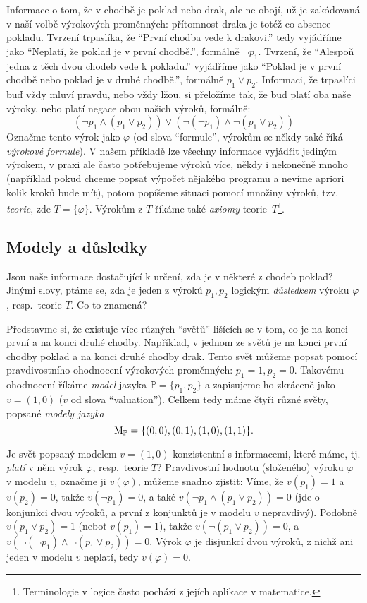 Informace o tom, že v chodbě je poklad nebo drak, ale ne obojí, už je zakódovaná v naší volbě výrokových proměnných: přítomnost draka je totéž co absence pokladu. Tvrzení trpaslíka, že ``První chodba vede k drakovi.'' tedy vyjádříme jako ``Neplatí, že poklad je v první chodbě.'', formálně \(\neg p_1\). Tvrzení, že ``Alespoň jedna z těch dvou chodeb vede k pokladu.'' vyjádříme jako ``Poklad je v první chodbě nebo poklad je v druhé chodbě.'', formálně \( p_1 \lor p_2\). Informaci, že trpaslíci buď vždy mluví pravdu, nebo vždy lžou, si přeložíme tak, že buď platí oba naše výroky, nebo platí negace obou našich výroků, formálně:
\[
    (\neg p_1 \land (p_1 \lor p_2)) \lor (\neg (\neg p_1) \land \neg (p_1 \lor p_2))
\]
Označme tento výrok jako \( \varphi \) (od slova ``formule'', výrokům se někdy také říká \emph{výrokové formule}). V našem příkladě lze všechny informace vyjádřit jediným výrokem, v praxi ale často potřebujeme výroků více, někdy i nekonečně mnoho (například pokud chceme popsat výpočet nějakého programu a nevíme apriori kolik kroků bude mít), potom popíšeme situaci pomocí množiny výroků, tzv. \emph{teorie}, zde \( T=\{ \varphi \} \). Výrokům z \( T \) říkáme také \emph{axiomy} teorie~\( T \)\footnote{Terminologie v logice často pochází z jejích aplikace v matematice.}.

\subsection{Modely a důsledky}

Jsou naše informace dostačující k určení, zda je v některé z chodeb poklad? Jinými slovy, ptáme se, zda je jeden z výroků \( p_1, p_2 \) logickým \emph{důsledkem} výroku \( \varphi \), resp.\ teorie \( T \). Co to znamená?

Představme si, že existuje více různých ``světů'' lišících se v tom, co je na konci první a na konci druhé chodby. Například, v jednom ze světů je na konci první chodby poklad a na konci druhé chodby drak. Tento svět můžeme popsat pomocí pravdivostního ohodnocení výrokových proměnných: \( p_1=1, p_2=0 \). Takovému ohodnocení říkáme \emph{model} jazyka \( \mathbb P=\{p_1,p_2\} \) a zapisujeme ho zkráceně jako \( v = (1,0) \) (\(v\) od slova ``valuation''). Celkem tedy máme čtyři různé světy, popsané \emph{modely jazyka}
\[
    \operatorname{M}_\mathbb P=\{(0,0),(0,1),(1,0),(1,1)\}.
\]

Je svět popsaný modelem \( v = (1,0) \) konzistentní s informacemi, které máme, tj. \emph{platí} v něm výrok \( \varphi \), resp.\ teorie \( T \)? Pravdivostní hodnotu (složeného) výroku \( \varphi \) v modelu \(v\), označme ji \( v(\varphi) \), můžeme snadno zjistit: Víme, že \( v(p_1) = 1 \) a \( v(p_2) = 0 \), takže \( v(\neg p_1) = 0 \), a také \( v(\neg p_1 \land (p_1 \lor p_2))=0 \) (jde o konjunkci dvou výroků, a první z konjunktů je v modelu \( v \) nepravdivý). Podobně \( v(p_1 \lor p_2)=1 \) (neboť \( v(p_1) = 1 \)), takže \( v(\neg(p_1 \lor p_2))=0 \), a \( v(\neg (\neg p_1) \land \neg (p_1 \lor p_2))=0 \). Výrok \( \varphi \) je disjunkcí dvou výroků, z nichž ani jeden v modelu \(v\) neplatí, tedy \( v(\varphi)=0 \).  

